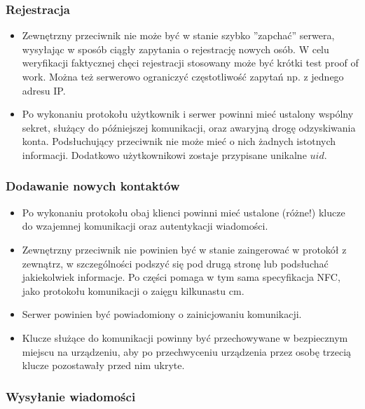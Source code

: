 \documentclass{article}
\begin{document}
\subsubsection{Rejestracja}

\begin{itemize}
\item Zewnętrzny przeciwnik nie może być w stanie szybko ''zapchać'' serwera, wysyłając w sposób ciągły zapytania
o rejestrację nowych osób. W celu weryfikacji faktycznej chęci rejestracji stosowany może być krótki test proof of work. Można też serwerowo ograniczyć częstotliwość zapytań np. z jednego adresu IP.

\item Po wykonaniu protokołu użytkownik i serwer powinni mieć ustalony wspólny sekret, służący do późniejszej komunikacji, oraz awaryjną drogę odzyskiwania konta. Podsłuchujący przeciwnik nie może mieć o nich żadnych istotnych informacji. Dodatkowo użytkownikowi zostaje przypisane
unikalne $uid$.
\end{itemize}

\subsubsection{Dodawanie nowych kontaktów}

\begin{itemize}
\item Po wykonaniu protokołu obaj klienci powinni mieć ustalone (różne!) klucze do wzajemnej komunikacji oraz autentykacji wiadomości.

\item Zewnętrzny przeciwnik nie powinien być w stanie zaingerować w protokół z zewnątrz, w szczególności podszyć się pod drugą stronę
lub podsłuchać jakiekolwiek informacje. Po części pomaga w tym sama specyfikacja NFC, jako protokołu komunikacji o zaięgu kilkunastu cm.

\item Serwer powinien być powiadomiony o zainicjowaniu komunikacji.

\item Klucze służące do komunikacji powinny być przechowywane w bezpiecznym miejscu na urządzeniu, aby po przechwyceniu urządzenia
przez osobę trzecią klucze pozostawały przed nim ukryte.
\end{itemize}

\subsubsection{Wysyłanie wiadomości}
\end{document}
